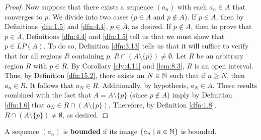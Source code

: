 \documentclass[../main.tex]{subfiles}
\begin{document}
\begin{theorem}
\begin{proof}
        Now suppose that there exists a sequence $(a_n)$ with each $a_n\in A$ that converges to $p$. We divide into two cases ($p\in A$ and $p\notin A$). If $p\in A$, then by Definitions \ref{dfn:1.5} and \ref{dfn:4.4}, $p\in\overline{A}$, as desired. If $p\notin A$, then to prove that $p\in\overline{A}$, Definitions \ref{dfn:4.4} and \ref{dfn:1.5} tell us that we must show that $p\in LP(A)$. To do so, Definition \ref{dfn:3.13} tells us that it will suffice to verify that for all regions $R$ containing $p$, $R\cap(A\setminus\{p\})\neq\emptyset$. Let $R$ be an arbitrary region $R$ with $p\in R$. By Corollary \ref{cly:4.11} and \ref{lem:8.3}, $R$ is an open interval. Thus, by Definition \ref{dfn:15.2}, there exists an $N\in\mathbb{N}$ such that if $n\geq N$, then $a_n\in R$. It follows that $a_N\in R$. Additionally, by hypothesis, $a_N\in A$. These results combined with the fact that $A=A\setminus\{p\}$ (since $p\notin A$) imply by Definition \ref{dfn:1.6} that $a_N\in R\cap(A\setminus\{p\})$. Therefore, by Definition \ref{dfn:1.8}, $R\cap(A\setminus\{p\})\neq\emptyset$, as desired.
    \end{proof}
\end{theorem}

\begin{definition}\label{dfn:15.12}
    A sequence $(a_n)$ is \textbf{bounded} if its image $\{a_n\mid n\in\mathbb{N}\}$ is bounded.
\end{definition}
\end{document}
